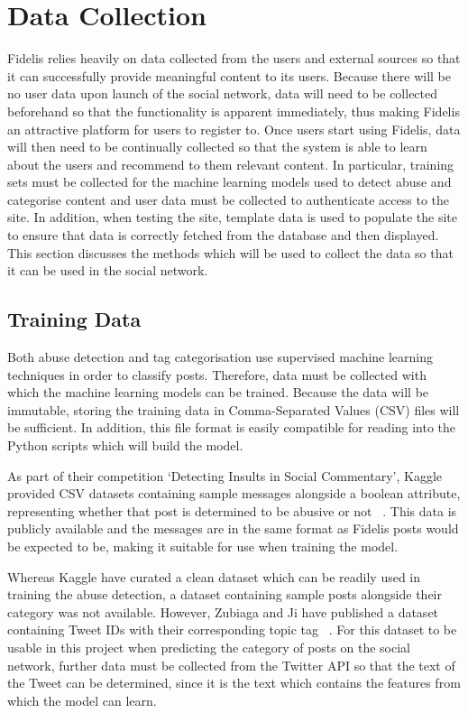 \section{Data Collection}
Fidelis relies heavily on data collected from the users and external sources so that it can successfully provide meaningful content to its users. Because there will be no user data upon launch of the social network, data will need to be collected beforehand so that the functionality is apparent immediately, thus making Fidelis an attractive platform for users to register to. Once users start using Fidelis, data will then need to be continually collected so that the system is able to learn about the users and recommend to them relevant content. In particular, training sets must be collected for the machine learning models used to detect abuse and categorise content and user data must be collected to authenticate access to the site. In addition, when testing the site, template data is used to populate the site to ensure that data is correctly fetched from the database and then displayed. This section discusses the methods which will be used to collect the data so that it can be used in the social network.

\subsection{Training Data}
Both abuse detection and tag categorisation use supervised machine learning techniques in order to classify posts.  Therefore, data must be collected with which the machine learning models can be trained. Because the data will be immutable, storing the training data in Comma-Separated Values (CSV) files will be sufficient. In addition, this file format is easily compatible for reading into the Python scripts which will build the model.

As part of their competition `Detecting Insults in Social Commentary', Kaggle provided CSV datasets containing sample messages alongside a boolean attribute, representing whether that post is determined to be abusive or not ~\cite{Kaggle:Dataset}. This data is publicly available and the messages are in the same format as Fidelis posts would be expected to be, making it suitable for use when training the model.

Whereas Kaggle have curated a clean dataset which can be readily used in training the abuse detection, a dataset containing sample posts alongside their category was not available. However, Zubiaga and Ji have published a dataset containing Tweet IDs with their corresponding topic tag ~\cite{Zubiaga:Tweets}. For this dataset to be usable in this project when predicting the category of posts on the social network, further data must be collected from the Twitter API so that the text of the Tweet can be determined, since it is the text which contains the features from which the model can learn.

